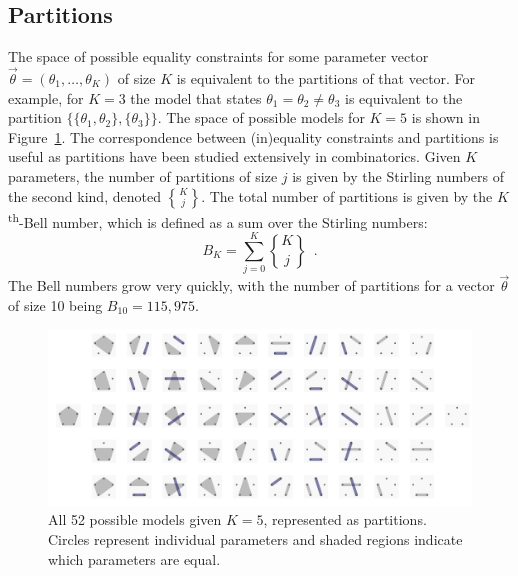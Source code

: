 \documentclass[11pt,a4paper]{article}
\theoremstyle{definition} %
\theoremstyle{case}
\DeclareRobustCommand{\stirling}{\genfrac\{\}{0pt}{}}
\newcommand{\bellnum}[1]{B_{#1}}
\begin{document}
\subsection{Partitions}
The space of possible equality constraints for some parameter vector $\vec{\theta} = (\theta_1, \ldots, \theta_K)$ of size $K$ is equivalent to the partitions of that vector. For example, for $K = 3$ the model that states $\theta_1 = \theta_2 \neq \theta_3$ is equivalent to the partition $\{\{\theta_1, \theta_2\}, \{\theta_3\}\}$. The space of possible models for $K = 5$ is shown in Figure~\ref{fig:partitions}. The correspondence between (in)equality constraints and partitions is useful as partitions have been studied extensively in combinatorics. Given $K$ parameters, the number of partitions of size $j$ is given by the Stirling numbers of the second kind, denoted $\stirling{K}{j}$. The total number of partitions is given by the $K$\textsuperscript{th}-Bell number, which is defined as a sum over the Stirling numbers:
\begin{equation}
    \bellnum{K} = \sum_{j = 0}^K \stirling{K}{j} \enspace .
\end{equation}
The Bell numbers grow very quickly, with the number of partitions for a vector $\vec{\theta}$ of size 10 being $B_{10} = 115,975$. %

\begin{figure}
    \centering
    \includegraphics[width = \textwidth, keepaspectratio]{figures/modelspace_5_horizontal.pdf}
    \caption{All 52 possible models given $K = 5$, represented as partitions. Circles represent individual parameters and shaded regions indicate which parameters are equal.}
    \label{fig:partitions}
\end{figure}
\end{document}
